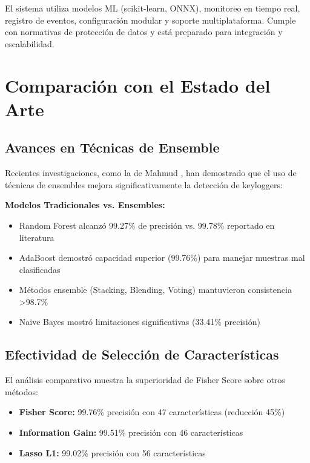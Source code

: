 \documentclass[conference]{IEEEtran}
\begin{document}
El sistema utiliza modelos ML (scikit-learn, ONNX), monitoreo en tiempo real, registro de eventos, configuración modular y soporte multiplataforma. Cumple con normativas de protección de datos y está preparado para integración y escalabilidad.

\section{Comparación con el Estado del Arte}

\subsection{Avances en Técnicas de Ensemble}
Recientes investigaciones, como la de Mahmud \cite{mahmud2025trustworthy}, han demostrado que el uso de técnicas de ensembles mejora significativamente la detección de keyloggers:

\textbf{Modelos Tradicionales vs. Ensembles:}
\begin{itemize}
    \item Random Forest alcanzó 99.27\% de precisión vs. 99.78\% reportado en literatura \cite{rathore2018}
    \item AdaBoost demostró capacidad superior (99.76\%) para manejar muestras mal clasificadas
    \item Métodos ensemble (Stacking, Blending, Voting) mantuvieron consistencia >98.7\%
    \item Naive Bayes mostró limitaciones significativas (33.41\% precisión)
\end{itemize}

\subsection{Efectividad de Selección de Características}
El análisis comparativo muestra la superioridad de Fisher Score sobre otros métodos:
\begin{itemize}
    \item \textbf{Fisher Score:} 99.76\% precisión con 47 características (reducción 45\%)
    \item \textbf{Information Gain:} 99.51\% precisión con 46 características
    \item \textbf{Lasso L1:} 99.02\% precisión con 56 características
\end{itemize}
\end{document}

